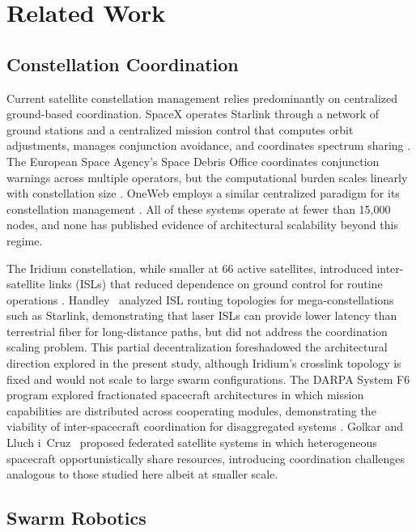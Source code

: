 \documentclass[journal]{IEEEtran}
\begin{document}
\section{Related Work}

\subsection{Constellation Coordination}

Current satellite constellation management relies predominantly on centralized ground-based coordination. SpaceX operates Starlink through a network of ground stations and a centralized mission control that computes orbit adjustments, manages conjunction avoidance, and coordinates spectrum sharing \cite{starlink_ops}. The European Space Agency's Space Debris Office coordinates conjunction warnings across multiple operators, but the computational burden scales linearly with constellation size \cite{esa_conjunction}. OneWeb employs a similar centralized paradigm for its constellation management \cite{oneweb_mgmt}. All of these systems operate at fewer than 15{,}000 nodes, and none has published evidence of architectural scalability beyond this regime.

The Iridium constellation, while smaller at 66 active satellites, introduced inter-satellite links (ISLs) that reduced dependence on ground control for routine operations \cite{iridium_arch}. Handley~\cite{handley_2018} analyzed ISL routing topologies for mega-constellations such as Starlink, demonstrating that laser ISLs can provide lower latency than terrestrial fiber for long-distance paths, but did not address the coordination scaling problem. This partial decentralization foreshadowed the architectural direction explored in the present study, although Iridium's crosslink topology is fixed and would not scale to large swarm configurations. The DARPA System F6 program explored fractionated spacecraft architectures in which mission capabilities are distributed across cooperating modules, demonstrating the viability of inter-spacecraft coordination for disaggregated systems \cite{darpa_f6}. Golkar and Lluch i~Cruz~\cite{golkar_federated} proposed federated satellite systems in which heterogeneous spacecraft opportunistically share resources, introducing coordination challenges analogous to those studied here albeit at smaller scale.

\subsection{Swarm Robotics}
\end{document}
